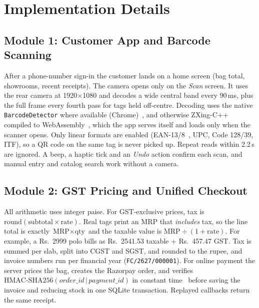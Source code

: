 \documentclass[12pt,letterpaper,twoside,openany]{report}
\begin{document}
\section{Implementation Details}

\subsection{Module 1: Customer App and Barcode Scanning}
After a phone-number sign-in the customer lands on a home screen (bag total, showrooms,
recent receipts). The camera opens only on the \emph{Scan} screen. It uses the rear camera
at 1920$\times$1080 and decodes a wide central band every 90\,ms, plus the full frame every
fourth pass for tags held off-centre. Decoding uses the native \texttt{BarcodeDetector}
where available (Chrome)~\cite{shapedetect}, and otherwise ZXing-C++ compiled to
WebAssembly~\cite{zxing}, which the app serves itself and loads only when the scanner opens.
Only linear formats are enabled (EAN-13/8~\cite{gs1}, UPC, Code 128/39, ITF), so a QR code on
the same tag is never picked up. Repeat reads within 2.2\,s are ignored. A beep, a haptic
tick and an \emph{Undo} action confirm each scan, and manual entry and catalog search
work without a camera.

\subsection{Module 2: GST Pricing and Unified Checkout}
All arithmetic uses integer paise. For GST-exclusive prices, tax is
$\mathrm{round}(\text{subtotal}\times\text{rate})$. Real tags print an MRP that
\emph{includes} tax, so the line total is exactly $\text{MRP}\times\text{qty}$ and the taxable
value is $\text{MRP}\div(1+\text{rate})$. For example, a Rs.~2999 polo bills as Rs.~2541.53
taxable + Rs.~457.47 GST. Tax is summed per slab, split into CGST and SGST, and rounded to
the rupee, and invoice numbers run per financial year (\texttt{FC/2627/000001}). For online
payment the server prices the bag, creates the Razorpay order, and verifies
$\text{HMAC-SHA256}(\textit{order\_id}\,|\,\textit{payment\_id})$ in constant
time~\cite{hmac,razorpay} before saving the invoice and reducing stock in one SQLite
transaction. Replayed callbacks return the same receipt.
\end{document}
